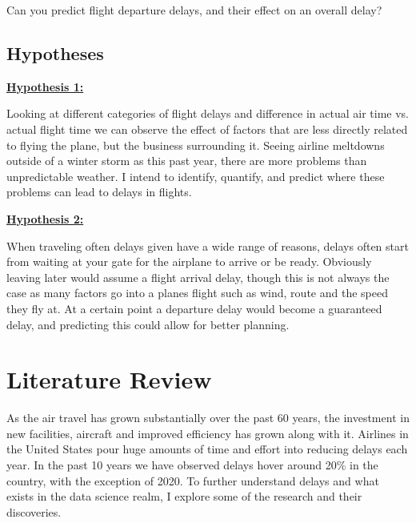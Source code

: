 \documentclass[a4paper,12pt]{article}
\begin{document}
Can you predict flight departure delays, and their effect on an overall delay?



\subsection{Hypotheses}

\textbf{\underline{Hypothesis 1:}}

Looking at different categories of flight delays and difference in actual air time vs. actual flight
time we can observe the effect of factors that are less directly related to flying the plane, but the
business surrounding it. Seeing airline meltdowns outside of a winter storm as this past year,
there are more problems than unpredictable weather. I intend to identify, quantify, and predict
where these problems can lead to delays in flights.

\noindent \textbf{\underline{Hypothesis 2:}}

When traveling often delays given have a wide range of reasons, delays often start from waiting at your gate 
for the airplane to arrive or be ready. Obviously leaving later would assume a flight arrival delay, though this is not always the case
as many factors go into a planes flight such as wind, route and the speed they fly at. At a certain point a departure delay 
would become a guaranteed delay, and predicting this could allow for better planning.



\pagebreak

\section{Literature Review}

As the air travel has grown substantially over the past 60 years, the investment in new facilities, aircraft and improved efficiency has grown along with it.
Airlines in the United States pour huge amounts of time and effort into reducing delays each year. In the past 10 years we have observed delays hover around 20\%
in the country, with the exception of 2020. To further understand delays and what exists in the data science realm, I explore some of the research and their discoveries.
\end{document}
